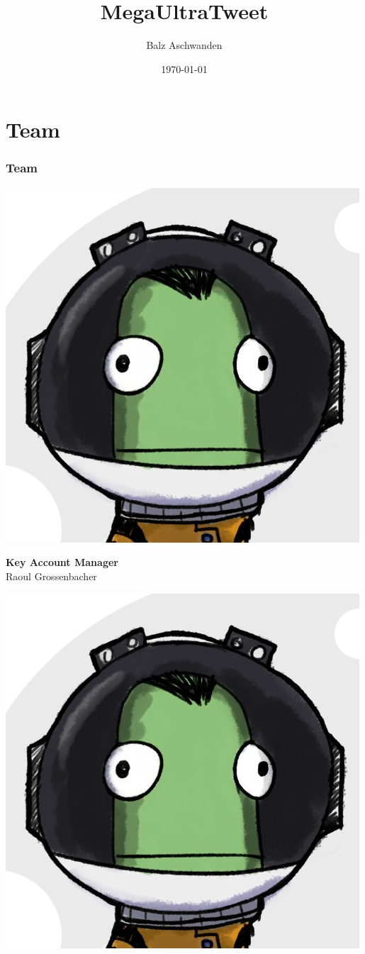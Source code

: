 \documentclass{beamer}
\title{MegaUltraTweet}
\author{Balz Aschwanden}
\date{\today}
\begin{document}
\frame{\titlepage} 

\section{Team}
\begin{frame}
  \frametitle{Team}
  \begin{minipage}{.2\textwidth}
    \includegraphics[height=.2\textheight]{balz}
  \end{minipage}%
  \hfill
  \begin{minipage}{.8\textwidth}
    \textbf{Key Account Manager} \\ Raoul Grossenbacher \pause \\    
  \end{minipage}
  \begin{minipage}{.2\textwidth}
    \includegraphics[height=.2\textheight]{balz}

\end{minipage}
\end{frame}
\end{document}
